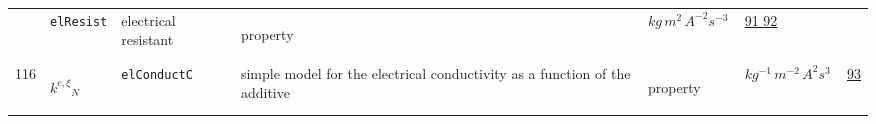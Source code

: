 \begin{longtable}{|p{1cm}|p{2.5cm}|p{4.5cm}|p{8cm}|p{3.0cm}|p{3cm}|p{1cm}|}
             & \verb|elResist|
             & electrical resistant
             & \begin{lay}property \end{lay}
             & $ kg \,m^{2} \,A^{-2} s^{-3} \, $
             & \hyperlink{"e:91"}{ 91 }
                 \hyperlink{"e:92"}{ 92 }
                 \\
    116
             & \hypertarget{"v:116"}{ $ {{k^{e,\xi}}}{_{N}} $}
             & \verb|elConductC|
             & simple model for the electrical conductivity as a function of the additive
             & \begin{lay}property \end{lay}
             & $ kg^{-1} \,m^{-2} \,A^{2} s^{3} \, $
             & \hyperlink{"e:93"}{ 93 }
                 \\
    \end{longtable}